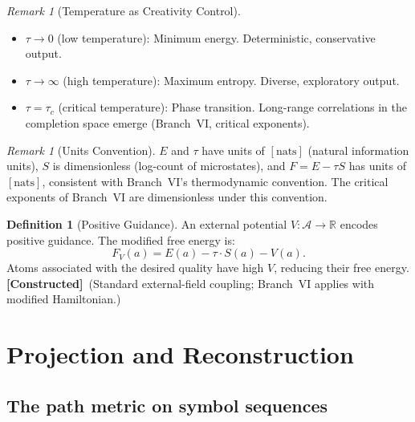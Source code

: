 \documentclass[11pt,a4paper]{article}
\theoremstyle{definition}
\newtheorem{definition}[theorem]{Definition}
\theoremstyle{remark}
\newtheorem{remark}[theorem]{Remark}
\newcommand{\R}{\mathbb{R}}
\newcommand{\statusconstructed}{\textcolor{blue!70!black}{\textbf{[Constructed]}}}
\begin{document}
\begin{remark}[Temperature as Creativity Control]\label{rem:temperature}
\begin{itemize}[nosep]
    \item $\tau \to 0$ (low temperature): Minimum energy. 
    Deterministic, conservative output.
    \item $\tau \to \infty$ (high temperature): Maximum entropy. 
    Diverse, exploratory output.
    \item $\tau = \tau_c$ (critical temperature): Phase transition. 
    Long-range correlations in the completion space emerge 
    (Branch~VI, critical exponents).
\end{itemize}
\end{remark}

\begin{remark}[Units Convention]\label{rem:units}
$E$ and $\tau$ have units of $[\text{nats}]$ (natural information 
units), $S$ is dimensionless (log-count of microstates), and 
$F = E - \tau S$ has units of $[\text{nats}]$, consistent with 
Branch~VI's thermodynamic convention. The critical exponents of 
Branch~VI are dimensionless under this convention.
\end{remark}

\begin{definition}[Positive Guidance]\label{def:guidance}
An external potential $V : \mathcal{A} \to \R$ encodes positive 
guidance. The modified free energy is:
\begin{equation}\label{eq:guided_free_energy}
    F_V(a) = E(a) - \tau \cdot S(a) - V(a).
\end{equation}
Atoms associated with the desired quality have high $V$, reducing 
their free energy. \statusconstructed\ (Standard external-field 
coupling; Branch~VI applies with modified Hamiltonian.)
\end{definition}


\section{Projection and Reconstruction}\label{sec:projection}

\subsection{The path metric on symbol sequences}%
\label{sec:path_metric}
\end{document}
